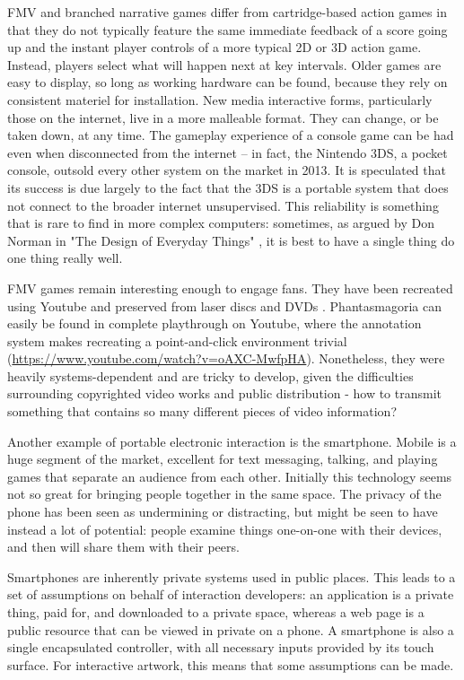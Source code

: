 FMV and branched narrative games differ from cartridge-based action games in that they do not typically feature the same immediate feedback of a score going up and the instant player controls of a more typical 2D or 3D action game. Instead, players select what will happen next at key intervals. Older games are easy to display, so long as working hardware can be found, because they rely on consistent materiel for installation. New media interactive forms, particularly those on the internet, live in a more malleable format. They can change, or be taken down, at any time. The gameplay experience of a console game can be had even when disconnected from the internet – in fact, the Nintendo 3DS, a pocket console, outsold every other system on the market in 2013. It is speculated that its success is due largely to the fact that the 3DS is a portable system that does not connect to the broader internet unsupervised. This reliability is something that is rare to find in more complex computers: sometimes, as argued by Don Norman in "The Design of Everyday Things" \parencite{norman}, it is best to have a single thing do one thing really well. 

FMV games remain interesting enough to engage fans. They have been recreated using Youtube and preserved from laser discs and DVDs \parencite{laserdiscarcade}. Phantasmagoria can easily be found in complete playthrough on Youtube, where the annotation system makes recreating a point-and-click environment trivial (\url{https://www.youtube.com/watch?v=oAXC-MwfpHA}). Nonetheless, they were heavily systems-dependent and are tricky to develop, given the difficulties surrounding copyrighted video works and public distribution - how to transmit something that contains so many different pieces of video information?

Another example of portable electronic interaction is the smartphone. Mobile is a huge segment of the market, excellent for text messaging, talking, and playing games that separate an audience from each other. Initially this technology seems not so great for bringing people together in the same space. The privacy of the phone has been seen as undermining or distracting, but might be seen to have instead a lot of potential: people examine things one-on-one with their devices, and then will share them with their peers.

Smartphones are inherently private systems used in public places. This leads to a set of assumptions on behalf of interaction developers: an application is a private thing, paid for, and downloaded to a private space, whereas a web page is a public resource that can be viewed in private on a phone. A smartphone is also a single encapsulated controller, with all necessary inputs provided by its touch surface. For interactive artwork, this means that some assumptions can be made.

